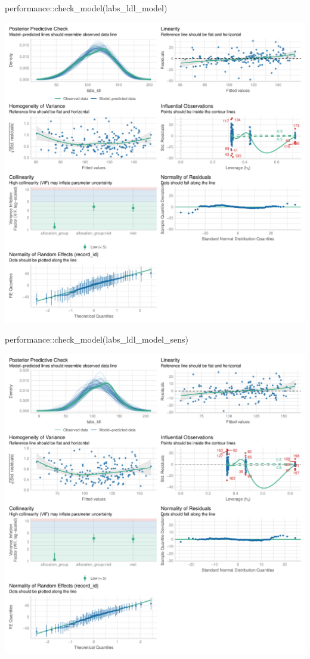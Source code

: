 \documentclass[
  letterpaper,
  DIV=11,
  numbers=noendperiod]{scrartcl}
\newenvironment{Shaded}{\begin{snugshade}}{\end{snugshade}}
\newcommand{\FunctionTok}[1]{\textcolor[rgb]{0.28,0.35,0.67}{#1}}
\newcommand{\NormalTok}[1]{\textcolor[rgb]{0.00,0.23,0.31}{#1}}
\newcommand{\SpecialCharTok}[1]{\textcolor[rgb]{0.37,0.37,0.37}{#1}}
\begin{document}
\begin{Shaded}
\begin{Highlighting}[]
\NormalTok{performance}\SpecialCharTok{::}\FunctionTok{check\_model}\NormalTok{(labs\_ldl\_model)}
\end{Highlighting}
\end{Shaded}

\includegraphics{Outcomes_V1V2V3_files/figure-pdf/labs_ldl_4-1.pdf}

\begin{Shaded}
\begin{Highlighting}[]
\NormalTok{performance}\SpecialCharTok{::}\FunctionTok{check\_model}\NormalTok{(labs\_ldl\_model\_sens)}
\end{Highlighting}
\end{Shaded}

\includegraphics{Outcomes_V1V2V3_files/figure-pdf/labs_ldl_4-2.pdf}
\end{document}
